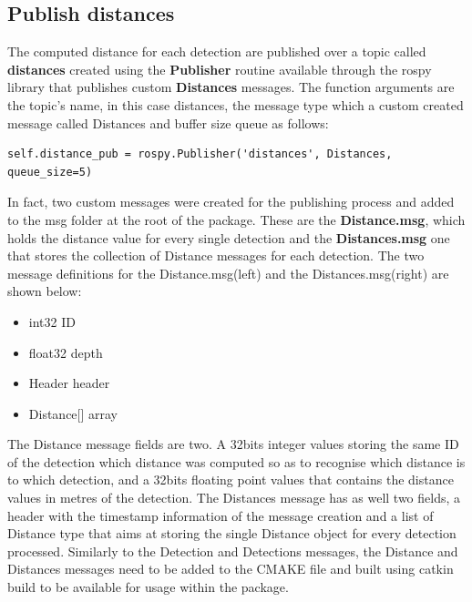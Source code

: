\subsection{Publish distances}

The computed distance for each detection are published over a topic called \textbf{distances} created using the \textbf{Publisher} routine available through the rospy library that publishes custom \textbf{Distances} messages. The function arguments are the topic's name, in this case distances, the message type which a custom created message called Distances and buffer size queue as follows:

\begin{lstlisting}
self.distance_pub = rospy.Publisher('distances', Distances, queue_size=5)
\end{lstlisting}

In fact, two custom messages were created for the publishing process and added to the msg folder at the root of the package. These are the \textbf{Distance.msg}, which holds the distance value for every single detection and the \textbf{Distances.msg} one that stores the collection of Distance messages for each detection. The two message definitions for the Distance.msg(left) and the Distances.msg(right) are shown below:

\begin{multicols}{2}
  \begin{itemize}
    \item int32 ID
    \item float32 depth
  \end{itemize}

  \columnbreak

  \begin{itemize}
    \item Header header
    \item Distance[] array
  \end{itemize}
\end{multicols}

The Distance message fields are two. A 32bits integer values storing the same ID of the detection which distance was computed so as to recognise which distance is to which detection, and a 32bits floating point values that contains the distance values in metres of the detection. The Distances message has as well two fields, a header with the timestamp information of the message creation and a list of Distance type that aims at storing the single Distance object for every detection processed. Similarly to the Detection and Detections messages, the Distance and Distances messages need to be added to the CMAKE file and built using catkin build to be available for usage within the package.

